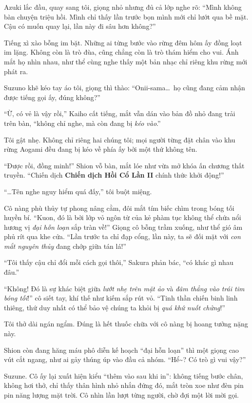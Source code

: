 \documentclass[../main.tex]{subfiles}
\begin{document}
Azuki lắc đầu, quay sang tôi, giọng nhỏ nhưng đủ cả lớp nghe rõ: ``Mình không bàn chuyện triệu hồi. Mình chỉ thấy lần trước bọn mình mới chỉ lướt qua bề mặt. Cậu có muốn quay lại, lần này đi sâu hơn không?''

Tiếng xì xào bỗng im bặt. Những ai từng bước vào rừng đêm hôm ấy đồng loạt im lặng. Không còn là trò đùa, cũng chẳng còn là trò thám hiểm cho vui. Ánh mắt họ nhìn nhau, như thể cùng nghe thấy một bản nhạc chỉ riêng khu rừng mới phát ra.

Suzuno khẽ kéo tay áo tôi, giọng thì thào: ``Onii-sama\dots\ họ cũng đang cảm nhận được tiếng gọi ấy, đúng không?''

``Ừ, có vẻ là vậy rồi,'' Kaiho cất tiếng, mắt vẫn dán vào bản đồ nhỏ đang trải trên bàn, ``không chỉ nghe, mà còn đang bị \emph{kéo vào}.''

Tôi gật nhẹ. Không chỉ riêng hai chúng tôi; mọi người từng đặt chân vào khu rừng Aogami đều đang bị kéo về phía ấy bởi một thứ không tên.

``Được rồi, đồng minh!'' Shion vỗ bàn, mắt lóe như vừa mở khóa ấn chương thất truyền. ``Chiến dịch \textbf{Chiến dịch Hồi Cổ Lần II} chính thức khởi động!''

``\dots Tên nghe nguy hiểm quá đấy,'' tôi buột miệng.

Cô nàng phù thủy tự phong nâng cằm, đôi mắt tím biếc chìm trong bóng tối huyền bí. ``Kuon, đó là bởi lớp vỏ ngôn từ của kẻ phàm tục không thể chứa nổi hương vị \textit{đại hỗn loạn} sắp tràn về!'' Giọng cô bỗng trầm xuống, như thể gió âm phủ rít qua khe cửa. ``Lần trước ta chỉ đạp cổng, lần này, ta sẽ đối mặt với \textit{con mắt nguyên thủy} đang chớp giữa tán lá!''

``Tôi thấy cậu chỉ đổi mỗi cách gọi thôi,'' Sakura phản bác, ``có khác gì nhau đâu.''

``Không! Đó là sự khác biệt giữa \textit{lướt nhẹ trên mặt ảo} và \textit{đâm thẳng vào trái tim bóng tối}!'' cô siết tay, khí thế như kiếm sắp rút vỏ. ``Tinh thần chiến binh linh thiêng, thứ duy nhất có thể bảo vệ chúng ta khỏi bị \textit{quá khứ nuốt chửng}!''

Tôi thở dài ngán ngẩm. Đúng là hết thuốc chữa với cô nàng bị hoang tưởng nặng này.

Shion còn đang hăng máu phô diễn kế hoạch ``đại hỗn loạn'' thì một giọng cao vút cắt ngang, như ai gảy thúng úp vào đầu cả nhóm. ``Hể\~{}? Có trò gì vui vậy?''

Suzune. Cô ấy lại xuất hiện kiểu ``thêm vào sau khi in'': không tiếng bước chân, không hơi thở, chỉ thấy thân hình nhỏ nhắn đứng đó, mắt tròn xoe như đèn pin pin năng lượng mặt trời. Cô nhìn lần lượt từng người, chờ đợi một lời mời gọi.
\end{document}

